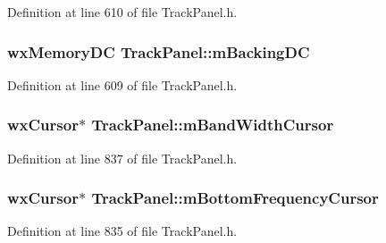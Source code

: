Definition at line 610 of file Track\+Panel.\+h.

\subsubsection[{\texorpdfstring{m\+Backing\+DC}{mBackingDC}}]{\setlength{\rightskip}{0pt plus 5cm}wx\+Memory\+DC Track\+Panel\+::m\+Backing\+DC\hspace{0.3cm}{\ttfamily [protected]}}\hypertarget{class_track_panel_acf9670b9b52fc68fb6d148e8c79cad95}{}\label{class_track_panel_acf9670b9b52fc68fb6d148e8c79cad95}


Definition at line 609 of file Track\+Panel.\+h.

\subsubsection[{\texorpdfstring{m\+Band\+Width\+Cursor}{mBandWidthCursor}}]{\setlength{\rightskip}{0pt plus 5cm}wx\+Cursor$\ast$ Track\+Panel\+::m\+Band\+Width\+Cursor\hspace{0.3cm}{\ttfamily [protected]}}\hypertarget{class_track_panel_a94be9bdea6c34977d0d74514458468ab}{}\label{class_track_panel_a94be9bdea6c34977d0d74514458468ab}


Definition at line 837 of file Track\+Panel.\+h.

\subsubsection[{\texorpdfstring{m\+Bottom\+Frequency\+Cursor}{mBottomFrequencyCursor}}]{\setlength{\rightskip}{0pt plus 5cm}wx\+Cursor$\ast$ Track\+Panel\+::m\+Bottom\+Frequency\+Cursor\hspace{0.3cm}{\ttfamily [protected]}}\hypertarget{class_track_panel_af59ffe3dcaa79ea7d3f650a77a3a668b}{}\label{class_track_panel_af59ffe3dcaa79ea7d3f650a77a3a668b}


Definition at line 835 of file Track\+Panel.\+h.

